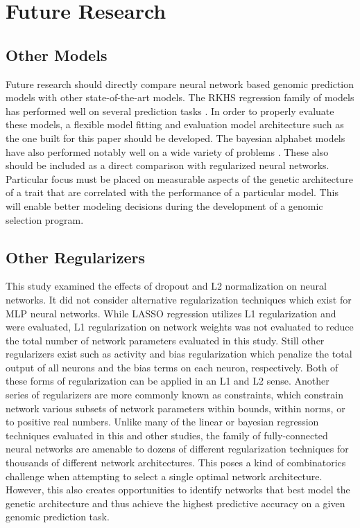 \section{Future Research}

\subsection*{Other Models}
Future research should directly compare neural network based genomic prediction
models with other state-of-the-art models. The RKHS regression family of models
has performed well on several prediction tasks \citep{heslot2012, crossa2010, gonzalez-recio2014, gianola2006}.
In order to properly evaluate these models, a flexible model fitting
and evaluation model architecture such as the one built for this paper should
be developed. The bayesian alphabet models have also performed notably well on
a wide variety of problems \citep{heslot2012, crossa2010, thavamanikumar2015}.
These also should be included as a direct comparison with regularized neural networks.
Particular focus must be placed on measurable aspects of the genetic architecture 
of a trait that are correlated with the performance of a particular model. This will 
enable better modeling decisions during the development of a genomic selection program.

\subsection*{Other Regularizers}

This study examined the effects of dropout and L2 normalization on neural networks. It 
did not consider alternative regularization techniques which exist for MLP neural
networks. While LASSO regression utilizes L1 regularization and were evaluated, 
L1 regularization on network weights was not evaluated 
to reduce the total number of network parameters evaluated in this study. 
Still other regularizers exist such as activity and bias regularization which 
penalize the total output of all neurons and the bias terms on each neuron, 
respectively. Both of these forms of regularization 
can be applied in an L1 and L2 sense. Another series of regularizers are more commonly
known as constraints, which constrain network various subsets of network parameters 
within bounds, within norms, or to positive real numbers. Unlike many of the 
linear or bayesian regression techniques evaluated in this and other studies, 
the family of fully-connected neural networks are amenable to dozens of different 
regularization techniques for thousands of different network architectures. This poses
a kind of combinatorics challenge when attempting to select a single optimal network 
architecture. However, this also creates opportunities to identify networks that 
best model the genetic architecture and thus achieve the highest predictive 
accuracy on a given genomic prediction task.

